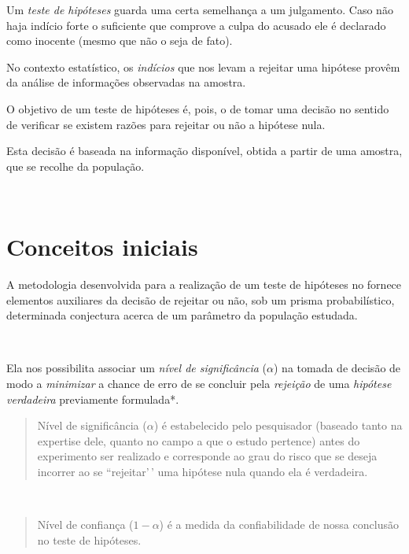 \documentclass[
]{book}
\begin{document}
\hfill\break

Um \emph{teste de hipóteses} guarda uma certa semelhança a um julgamento. Caso não haja indício forte o suficiente que comprove a culpa do acusado ele é declarado como inocente (mesmo que não o seja de fato).

\hfill\break

\hfill\break

No contexto estatístico, os \emph{indícios} que nos levam a rejeitar uma hipótese provêm da análise de informações observadas na amostra.

\hfill\break

O objetivo de um teste de hipóteses é, pois, o de tomar uma decisão no sentido de verificar se existem razões para rejeitar ou não a hipótese nula.

\hfill\break

Esta decisão é baseada na informação disponível, obtida a partir de uma amostra, que se recolhe da população.

~

\hypertarget{conceitos-iniciais}{%
\section{Conceitos iniciais}\label{conceitos-iniciais}}

A metodologia desenvolvida para a realização de um teste de hipóteses no fornece elementos auxiliares da decisão de rejeitar ou não, sob um prisma probabilístico, determinada conjectura acerca de um parâmetro da população estudada.

~

Ela nos possibilita associar um \emph{nível de significância} (\(\alpha\)) na tomada de decisão de modo a \emph{minimizar} a chance de erro de se concluir pela \emph{rejeição} de uma \emph{hipótese verdadeira} previamente formulada*.

\hfill\break

\begin{quote}
Nível de significância (\(\alpha\)) é estabelecido pelo pesquisador (baseado tanto na expertise dele, quanto no campo a que o estudo pertence) antes do experimento ser realizado e corresponde ao grau do risco que se deseja incorrer ao se ``rejeitar'\,' uma hipótese nula quando ela é verdadeira.
\end{quote}

~

\begin{quote}
Nível de confiança (\(1-\alpha\)) é a medida da confiabilidade de nossa conclusão no teste de hipóteses.
\end{quote}
\end{document}

